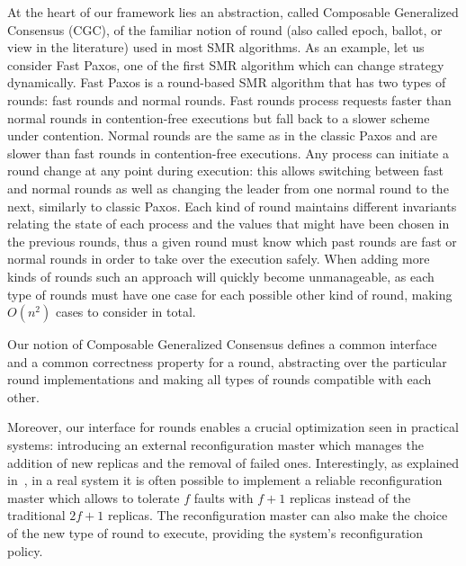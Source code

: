 At the heart of our framework lies an abstraction, called Composable Generalized
Consensus (CGC), of the familiar notion of round (also called epoch, ballot, or
view in the literature) used in most SMR algorithms. As an example, let us
consider Fast Paxos, one of the first SMR algorithm which can change strategy
dynamically. Fast Paxos is a round-based SMR algorithm that has two types of
rounds: fast rounds and normal rounds. Fast rounds process requests faster
than normal rounds in contention-free executions but fall back to a slower
scheme under contention. Normal rounds are the same as in the classic Paxos
and are slower than fast rounds in contention-free executions. Any process can
initiate a round change at any point during execution: this allows switching
between fast and normal rounds as well as changing the leader from one normal
round to the next, similarly to classic Paxos. Each kind of round maintains
different invariants relating the state of each process and the values that
might have been chosen in the previous rounds, thus a given round must know
which past rounds are fast or normal rounds in order to take over the execution
safely. When adding more kinds of rounds such an approach will quickly become
unmanageable, as each type of rounds must have one case for each possible other
kind of round, making $O(n^2)$ cases to consider in total.

Our notion of Composable Generalized Consensus defines a common interface and a
common correctness property for a round, abstracting over the particular round
implementations and making all types of rounds compatible with each other.

Moreover, our interface for rounds enables a crucial optimization seen in
practical systems: introducing an external reconfiguration master which manages
the addition of new replicas and the removal of failed ones. Interestingly, as
explained in~\cite{LamportMalkhiZhou09VerticalPaxosPrimarybackupReplication},
in a real system it is often possible to implement a reliable reconfiguration
master which allows to tolerate $f$ faults with $f+1$ replicas instead of the
traditional $2f+1$ replicas. The reconfiguration master can also make the choice
of the new type of round to execute, providing the system's reconfiguration
policy.
